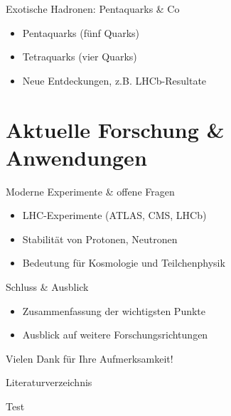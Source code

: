 \documentclass[aspectratio=169]{beamer} %
\begin{document}
    
    
    \begin{frame}{Exotische Hadronen: Pentaquarks \& Co}
      \begin{itemize}
        \item Pentaquarks (fünf Quarks)
        \item Tetraquarks (vier Quarks)
        \item Neue Entdeckungen, z.B. LHCb-Resultate
      \end{itemize}
    \end{frame}
    
    \section{Aktuelle Forschung \& Anwendungen}
    \begin{frame}{Moderne Experimente \& offene Fragen}
      \begin{itemize}
        \item LHC-Experimente (ATLAS, CMS, LHCb)
        \item Stabilität von Protonen, Neutronen
        \item Bedeutung für Kosmologie und Teilchenphysik
      \end{itemize}
    \end{frame}
    
    \begin{frame}{Schluss \& Ausblick}
      \begin{itemize}
        \item Zusammenfassung der wichtigsten Punkte
        \item Ausblick auf weitere Forschungsrichtungen
      \end{itemize}
      
      \centering
      \alert{Vielen Dank für Ihre Aufmerksamkeit!}
    \end{frame}

    \begin{frame}{Literaturverzeichnis}
   \printbibliography%
    \end{frame}

    \begin{frame}
        Test~\cite{Aaij.2015,Aaij.2019,C.Amsler.2017,GellMann.1964,Zweig.1964,Zweig.1964b}
    \end{frame}
\end{document}
